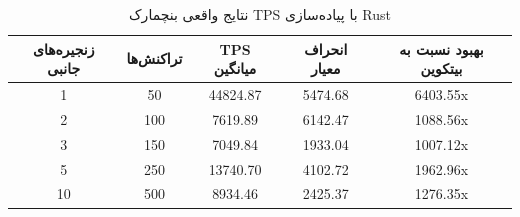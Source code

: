 \begin{table}[h]
\centering
\caption{نتایج واقعی بنچمارک TPS با پیاده‌سازی Rust}
\label{tab:real-tps-benchmark}
\begin{tabular}{|c|c|c|c|c|}
\hline
\textbf{زنجیره‌های جانبی} & \textbf{تراکنش‌ها} & \textbf{TPS میانگین} & \textbf{انحراف معیار} & \textbf{بهبود نسبت به بیتکوین} \\ \hline
1 & 50 & 44824.87 & 5474.68 & 6403.55x \\ \hline
2 & 100 & 7619.89 & 6142.47 & 1088.56x \\ \hline
3 & 150 & 7049.84 & 1933.04 & 1007.12x \\ \hline
5 & 250 & 13740.70 & 4102.72 & 1962.96x \\ \hline
10 & 500 & 8934.46 & 2425.37 & 1276.35x \\ \hline
\end{tabular}
\end{table}
